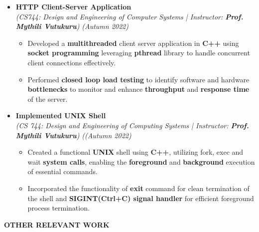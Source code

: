 \documentclass[a4paper,10pt]{article}
\newcommand{\resheading}[1]{{\small \colorbox{mygrey}{\begin{minipage}{0.99\textwidth}{\textbf{#1 \vphantom{p\^{E}}}}\end{minipage}}}}
\begin{document}
\begin{itemize}[noitemsep,nolistsep]
\item \textbf{HTTP Client-Server Application}\\
\emph{(CS744: Design and Engineering of Computer Systems | Instructor: \textbf{Prof. Mythili Vutukuru})} \hfill\emph{(Autumn 2022)}\\[-0.5cm]
	\begin{itemize}[noitemsep]
        \item Developed a \textbf{multithreaded} client server application in \textbf{C++} using \textbf{socket programming} leveraging \textbf{pthread} library to handle concurrent client connections effectively.
        \item Performed \textbf{closed loop load testing} to identify software and hardware \textbf{bottlenecks} to monitor and enhance \textbf{throughput} and \textbf{response time} of the server.
	\end{itemize}

\item \textbf{Implemented UNIX Shell}\\
\emph{(CS 744: Design and Engineering of Computing Systems | Instructor: \textbf{Prof. Mythili Vutukuru})} \hfill\emph{((Autumn 2022)}\\[-0.5cm]
	\begin{itemize}[noitemsep]
	\item Created a functional \textbf{UNIX} shell using \textbf{C++}, utilizing fork, exec and wait \textbf{system calls}, enabling the \textbf{foreground} and \textbf{background} execution of essential commands.
    \item Incorporated the functionality of \textbf{exit} command for clean termination of the shell and \textbf{SIGINT(Ctrl+C) signal handler} for efficient foreground process termination.
	\end{itemize}
\end{itemize}	
\resheading{\textbf{OTHER RELEVANT WORK} }\\
\end{document}
